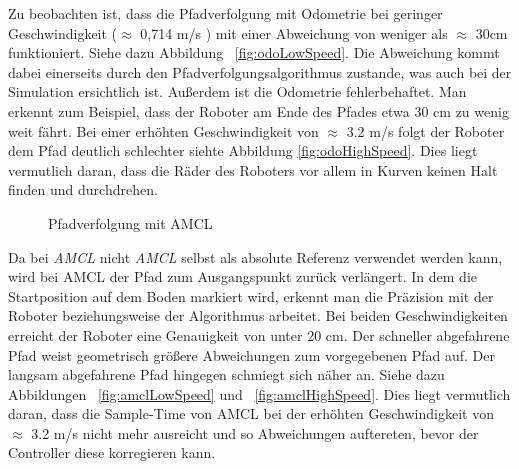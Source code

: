 \documentclass[11pt,a4paper]{article}
\begin{document}
{Zu beobachten ist, dass die Pfadverfolgung mit Odometrie bei geringer Geschwindigkeit ($\approx$ 0,714 m/s ) mit einer Abweichung von weniger als $\approx$ 30cm funktioniert. Siehe dazu Abbildung ~\ref{fig:odoLowSpeed}. Die Abweichung kommt dabei einerseits durch den Pfadverfolgungsalgorithmus zustande, was auch bei der Simulation ersichtlich ist. Au{\ss}erdem ist die Odometrie fehlerbehaftet. Man erkennt zum Beispiel, dass der Roboter am Ende des Pfades etwa 30 cm zu wenig weit f\"ahrt.
Bei einer erh\"ohten Geschwindigkeit von $\approx$ 3.2 m/s folgt der Roboter dem Pfad deutlich schlechter siehte Abbildung \ref{fig:odoHighSpeed}. Dies liegt vermutlich daran, dass die R\"ader des Roboters vor allem in Kurven keinen Halt finden und durchdrehen.   


\begin{figure}[h]
	\centering
	\caption{Pfadverfolgung mit AMCL}
\end{figure}

Da bei \textit{AMCL} nicht \textit{AMCL} selbst als absolute Referenz verwendet werden kann, wird bei AMCL der Pfad zum Ausgangspunkt zur\"uck verl\"angert. In dem die Startposition auf dem Boden markiert wird, erkennt man die Pr\"azision mit der Roboter beziehungsweise der Algorithmus arbeitet.
Bei beiden Geschwindigkeiten erreicht der Roboter eine Genauigkeit von unter 20 cm. Der schneller abgefahrene Pfad weist geometrisch gr\"o{\ss}ere Abweichungen zum vorgegebenen Pfad auf. Der langsam abgefahrene Pfad hingegen schmiegt sich n\"aher an. Siehe dazu Abbildungen ~\ref{fig:amclLowSpeed} und ~\ref{fig:amclHighSpeed}.  
Dies liegt vermutlich daran, dass die Sample-Time von AMCL bei der erh\"ohten Geschwindigkeit  von $\approx$ 3.2 m/s nicht mehr ausreicht und so Abweichungen auftereten, bevor der Controller diese korregieren kann. 

}
\end{document}
